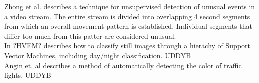 Zhong et al. \cite{10.1109/CVPR.2004.78} describes a technique for unsupervised detection of unusual events in a video stream. The entire stream is divided into overlapping 4 second segments from which an overall movement pattern is established. Individual segments that differ too much from this patter are considered unusual.\\
In \cite{mangler} ?HVEM? describes how to classify still images through a hierachy of Support Vector Machines, including day/night classification. UDDYB\\
Angin et. al \cite{10.1109/MDM.2010.71} describes a method of automatically detecting the color of traffic lights. UDDYB %
%
